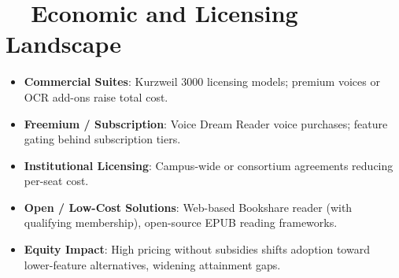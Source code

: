 \section{~~Economic and Licensing Landscape}
\label{sec:sr27-economics}
\begin{itemize}
	\item \textbf{Commercial Suites}: Kurzweil 3000 licensing models; premium voices or OCR add-ons raise total cost.
	\item \textbf{Freemium / Subscription}: Voice Dream Reader voice purchases; feature gating behind subscription tiers.
	\item \textbf{Institutional Licensing}: Campus-wide or consortium agreements reducing per-seat cost.
	\item \textbf{Open / Low-Cost Solutions}: Web-based Bookshare reader (with qualifying membership), open-source EPUB reading frameworks.
	\item \textbf{Equity Impact}: High pricing without subsidies shifts adoption toward lower-feature alternatives, widening attainment gaps\supercite{Lee2019}.
\end{itemize}

